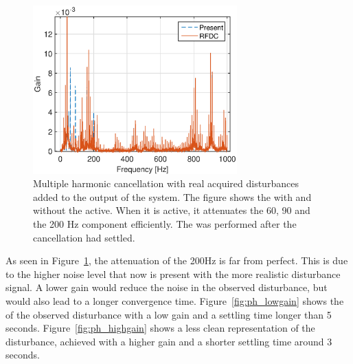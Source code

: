 \begin{figure}[h!]
  \centering
  \includegraphics[width=0.7\textwidth]{fig/matlab/3real_dist_fft.eps}
  \caption{\label{fig:fft_linear} Multiple harmonic cancellation with real acquired disturbances added to the output of the system. The figure shows the \abbrFFT with and without the \abbrRFDC active. When it is active, it attenuates the 60, 90 and the 200 Hz component efficiently. The \abbrFFT was performed after the cancellation had settled.}
\end{figure}

As seen in Figure~\ref{fig:fft_linear}, the attenuation of the 200Hz is far from perfect. This is due to the higher noise level that now is present with the more realistic disturbance signal. A lower gain would reduce the noise in the observed disturbance, but would also lead to a longer convergence time. Figure~\ref{fig:ph_lowgain} shows the \abbrFFT of the observed disturbance with a low gain and a settling time longer than 5 seconds. Figure~\ref{fig:ph_highgain} shows a less clean representation of the disturbance, achieved with a higher gain and a shorter settling time around 3 seconds.

